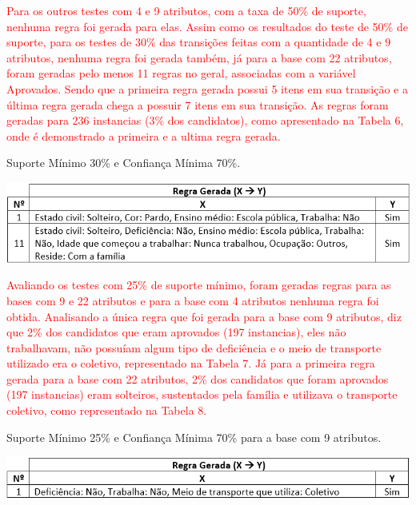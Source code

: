 \par
\textcolor{red}{Para os outros testes com 4 e 9 atributos, com a taxa de 50\% de suporte, nenhuma regra foi gerada para elas. Assim como os resultados do teste de 50\% de suporte, para os testes de 30\% das transições feitas com a quantidade de 4 e 9 atributos, nenhuma regra foi gerada também, já para a base com 22 atributos, foram geradas pelo menos 11 regras no geral, associadas com a variável Aprovados. Sendo que a primeira regra gerada possui 5 itens em sua transição e a última regra gerada chega a possuir 7 itens em sua transição. As regras foram geradas para 236 instancias (3\% dos candidatos), como apresentado na Tabela 6, onde é demonstrado a primeira e a ultima regra gerada.}

\par
\begin{table}[!htp]
	\begin{center}
    \caption{\label{fig:waveform_fig} Suporte Mínimo 30\% e Confiança Mínima 70\%.}
	\includegraphics[scale=0.75]{Figuras/Suporte_30_atributos_22.png}
	\end{center}
\end{table}


\par
\textcolor{red}{Avaliando os testes com 25\% de suporte mínimo, foram geradas regras para as bases com 9 e 22 atributos e para a base com 4 atributos nenhuma regra foi obtida. Analisando a única regra que foi gerada para a base com 9 atributos, diz que 2\% dos candidatos que eram aprovados (197 instancias), eles não trabalhavam, não possuíam algum tipo de deficiência e o meio de transporte utilizado era o coletivo, representado na Tabela 7. Já para a primeira regra gerada para a base com 22 atributos, 2\% dos candidatos que foram aprovados (197 instancias) eram solteiros, sustentados pela família e utilizava o transporte coletivo, como representado na Tabela 8.}

\par
\begin{table}[!htp]
	\begin{center}
    \caption{\label{fig:waveform_fig} Suporte Mínimo 25\% e Confiança Mínima 70\% para a base com 9 atributos.}
	\includegraphics[scale=0.75]{Figuras/Suporte_25_atributos_9.png}
	\end{center}
\end{table}

